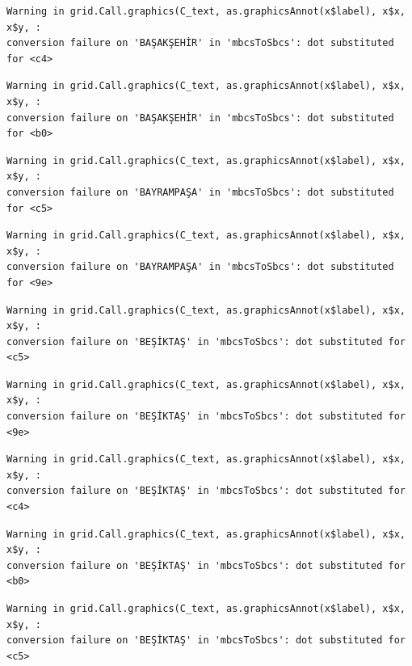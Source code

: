 \documentclass[
  11pt,
  a4paper,
  DIV=11,
  numbers=noendperiod]{scrartcl}
\begin{document}
\begin{verbatim}
Warning in grid.Call.graphics(C_text, as.graphicsAnnot(x$label), x$x, x$y, :
conversion failure on 'BAŞAKŞEHİR' in 'mbcsToSbcs': dot substituted for <c4>
\end{verbatim}

\begin{verbatim}
Warning in grid.Call.graphics(C_text, as.graphicsAnnot(x$label), x$x, x$y, :
conversion failure on 'BAŞAKŞEHİR' in 'mbcsToSbcs': dot substituted for <b0>
\end{verbatim}

\begin{verbatim}
Warning in grid.Call.graphics(C_text, as.graphicsAnnot(x$label), x$x, x$y, :
conversion failure on 'BAYRAMPAŞA' in 'mbcsToSbcs': dot substituted for <c5>
\end{verbatim}

\begin{verbatim}
Warning in grid.Call.graphics(C_text, as.graphicsAnnot(x$label), x$x, x$y, :
conversion failure on 'BAYRAMPAŞA' in 'mbcsToSbcs': dot substituted for <9e>
\end{verbatim}

\begin{verbatim}
Warning in grid.Call.graphics(C_text, as.graphicsAnnot(x$label), x$x, x$y, :
conversion failure on 'BEŞİKTAŞ' in 'mbcsToSbcs': dot substituted for <c5>
\end{verbatim}

\begin{verbatim}
Warning in grid.Call.graphics(C_text, as.graphicsAnnot(x$label), x$x, x$y, :
conversion failure on 'BEŞİKTAŞ' in 'mbcsToSbcs': dot substituted for <9e>
\end{verbatim}

\begin{verbatim}
Warning in grid.Call.graphics(C_text, as.graphicsAnnot(x$label), x$x, x$y, :
conversion failure on 'BEŞİKTAŞ' in 'mbcsToSbcs': dot substituted for <c4>
\end{verbatim}

\begin{verbatim}
Warning in grid.Call.graphics(C_text, as.graphicsAnnot(x$label), x$x, x$y, :
conversion failure on 'BEŞİKTAŞ' in 'mbcsToSbcs': dot substituted for <b0>
\end{verbatim}

\begin{verbatim}
Warning in grid.Call.graphics(C_text, as.graphicsAnnot(x$label), x$x, x$y, :
conversion failure on 'BEŞİKTAŞ' in 'mbcsToSbcs': dot substituted for <c5>
\end{verbatim}
\end{document}
